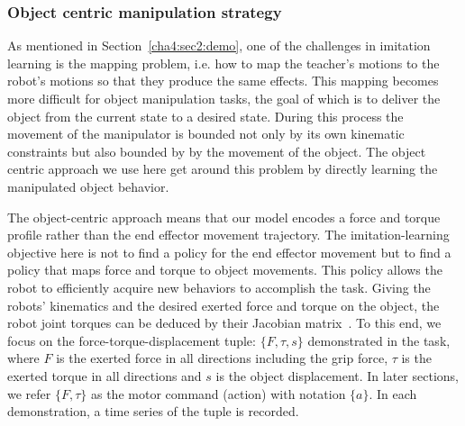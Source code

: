 %
%



\subsubsection{Object centric manipulation strategy}
\label{cha4:sec2:learn:objectlevel}


As mentioned in Section~\ref{cha4:sec2:demo}, one of the challenges in imitation learning is the mapping problem, i.e. how to map the teacher's motions to the robot's motions so that they produce the same effects. This mapping becomes more difficult for object manipulation tasks, the goal of which is to deliver the object from the current state to a desired state. During this process the movement of the manipulator is bounded not only by its own kinematic constraints but also bounded by by the movement of the object. The object centric approach we use here get around this problem by directly learning the manipulated object behavior.


The object-centric approach means that our model encodes a force and
torque profile rather than the end effector movement trajectory.  The
imitation-learning objective here is not to find a policy for the end
effector movement but to find a policy that maps force and torque
to object movements. This policy allows the robot to efficiently
acquire new behaviors to accomplish the
task. %
Giving the robots' kinematics and the desired exerted force and torque
on the object, the robot joint torques can be deduced by their Jacobian
matrix~\citep{okamura2000overview}. To this end, we focus on the
force-torque-displacement tuple: $\{F,\tau,s\}$ demonstrated in the
task, where $F$ is the exerted force in all directions including the
grip force, $\tau$ is the exerted torque in all directions and $s$ is
the object displacement. In later sections, we refer $\{F,\tau\}$ as
the motor command (action) with notation $\{a\}$. In each
demonstration, a time series of the tuple is recorded.




